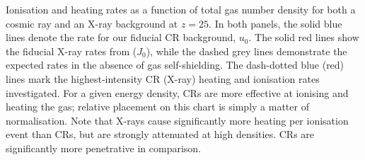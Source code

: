 Ionisation and heating rates as a function of total gas number density for both a cosmic ray and an X-ray background at $z=25$. In both panels, the solid blue lines denote the rate for our fiducial CR background, $u_0$. The solid red lines show the fiducial X-ray rates from \citet{Hummeletal2015} ($J_0$), while the dashed grey lines demonstrate the expected rates in the absence of gas self-shielding.  The dash-dotted blue (red) lines mark the highest-intensity CR (X-ray) heating and ionisation rates investigated. For a given energy density, CRs are more effective at ionising and heating the gas; relative placement on this chart is simply a matter of normalisation. Note that X-rays cause significantly more heating per ionisation event than CRs, but are strongly attenuated at high densities. CRs are significantly more penetrative in comparison.
